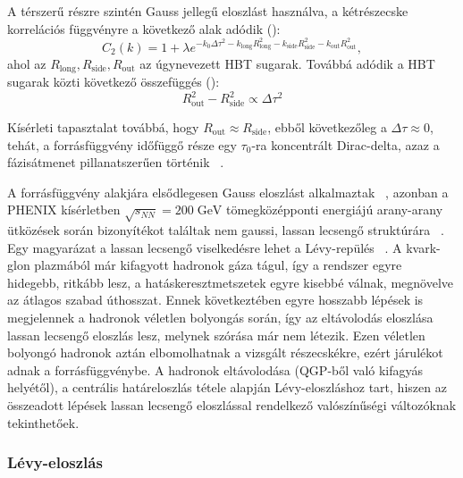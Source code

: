 \documentclass[11pt,a4paper]{article}
\numberwithin{equation}{subsection}
\numberwithin{figure}{section}
\begin{document}
A térszerű részre szintén Gauss jellegű eloszlást használva, a kétrészecske korrelációs függvényre a következő alak adódik (\cite{CsanadHabil}):
\begin{equation}
C_2(k)=1+\lambda e^{-k_0\Delta\tau^2-k_{\mathrm{long}}R_{\mathrm{long}}^2-k_{\mathrm{side}}R_{\mathrm{side}}^2-k_{\mathrm{out}}R_{\mathrm{out}}^2},
\end{equation}
ahol az $R_{\mathrm{long}},R_{\mathrm{side}},R_{\mathrm{out}}$ az úgynevezett HBT sugarak. Továbbá adódik a HBT sugarak közti következő összefüggés (\cite{CsanadHabil}):
\begin{equation}
R_{\mathrm{out}}^2-R_{\mathrm{side}}^2\propto \Delta\tau^2
\end{equation}

Kísérleti tapasztalat továbbá, hogy $R_{\mathrm{out}}\approx R_{\mathrm{side}}$, ebből következőleg a $\Delta\tau\approx 0$, tehát, a  forrásfüggvény időfüggő része egy $\tau_0$-ra koncentrált Dirac-delta, azaz a fázisátmenet pillanatszerűen történik ~\cite{Ster:2010ia, Csorgo:1999sj, Csanad:2009wc}.



A forrásfüggvény alakjára elsődlegesen Gauss eloszlást alkalmaztak ~\cite{Csorgo:2005gd, Lisa:2005dd}, azonban a PHENIX kísérletben $\sqrt{s_{NN}}=200\;\mathrm{GeV}$ tömegközépponti energiájú arany-arany ütközések során bizonyítékot találtak nem gaussi, lassan lecsengő struktúrára ~\cite{Adler:2006as}. Egy magyarázat a lassan lecsengő viselkedésre lehet a Lévy-repülés ~\cite{Csanad:2007fr}. A kvark-glon plazmából már kifagyott hadronok gáza tágul, így a rendszer egyre hidegebb, ritkább lesz, a hatáskeresztmetszetek egyre kisebbé válnak, megnövelve az átlagos szabad úthosszat. Ennek következtében egyre hosszabb lépések is megjelennek a hadronok véletlen bolyongás során, így az eltávolodás eloszlása lassan lecsengő eloszlás lesz, melynek szórása már nem létezik. Ezen véletlen bolyongó hadronok aztán elbomolhatnak a vizsgált részecskékre, ezért járulékot adnak a forrásfüggvénybe. A hadronok eltávolodása (QGP-ből való kifagyás helyétől), a centrális határeloszlás tétele alapján Lévy-eloszláshoz tart, hiszen az összeadott lépések lassan lecsengő eloszlással rendelkező valószínűségi változóknak tekinthetőek.

\subsubsection{Lévy-eloszlás}
\end{document}
